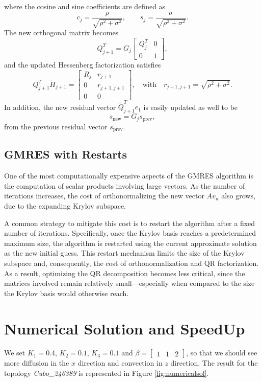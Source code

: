 \documentclass[hidelinks]{article}
\begin{document}
where the cosine and sine coefficients are defined as
\[
c_j = \frac{\rho}{\sqrt{\rho^2 + \sigma^2}}, \qquad
s_j = \frac{\sigma}{\sqrt{\rho^2 + \sigma^2}}.
\]
The new orthogonal matrix becomes
\[
Q^T_{j+1} = G_j 
\begin{bmatrix}
Q^T_j & 0 \\
0 & 1
\end{bmatrix},
\]
and the updated Hessenberg factorization satisfies
\[
Q^T_{j+1} \widetilde{H}_{j+1} =
\begin{bmatrix}
R_j & r_{j+1} \\
0 & r_{j+1,j+1} \\
0 & 0
\end{bmatrix},
\quad \text{with} \quad
r_{j+1,j+1} = \sqrt{\rho^2 + \sigma^2}.
\]
In addition, the new residual vector $\widetilde{Q}^T_{j+1}e_1$ is easily updated as well to be
\[
s_\text{new} = G_j s_\text{prev},
\]
from the previous residual vector $s_\text{prev}$.

\subsection{GMRES with Restarts}

One of the most computationally expensive aspects of the GMRES algorithm is the computation of scalar products involving large vectors. As the number of iterations increases, the cost of orthonormalizing the new vector $Av_n$ also grows, due to the expanding Krylov subspace.

A common strategy to mitigate this cost is to restart the algorithm after a fixed number of iterations. Specifically, once the Krylov basis reaches a predetermined maximum size, the algorithm is restarted using the current approximate solution as the new initial guess. This restart mechanism limits the size of the Krylov subspace and, consequently, the cost of orthonormalization and QR factorization. As a result, optimizing the QR decomposition becomes less critical, since the matrices involved remain relatively small—especially when compared to the size the Krylov basis would otherwise reach.

\section{Numerical Solution and SpeedUp}
We set $K_1 = 0.4$, $K_2 = 0.1$, $K_3 = 0.1$ and $\beta = \begin{bmatrix} 1 &1& 2 \end{bmatrix}$, so that we should see more diffusion in the $x$ direction and convection in $z$ direction. The result for the topology \emph{Cubo\_246389} is represented in Figure \ref{fig:numericalsol}.
\end{document}
